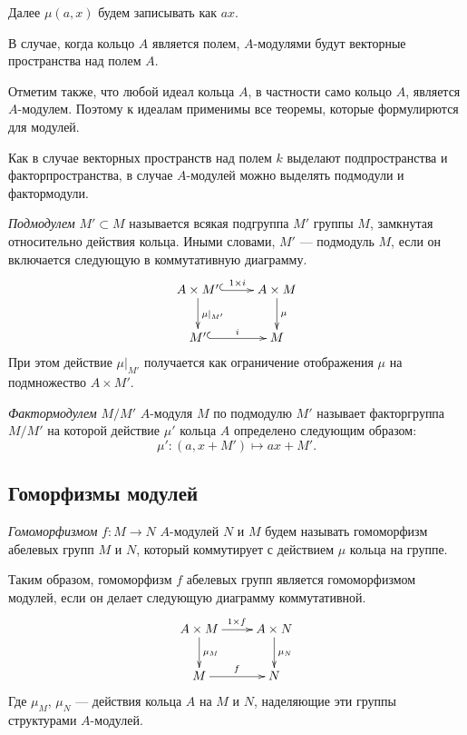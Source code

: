     Далее $\mu(a, x)$ будем записывать как $ax$. 
    
    В случае, когда кольцо $A$ является полем, $A$-модулями будут векторные пространства над полем $A$.
    
    Отметим также, что любой идеал кольца $A$, в частности само кольцо $A$, является $A$-модулем. 
    Поэтому к идеалам применимы все теоремы, которые формулирются для модулей.

    Как в случае векторных пространств над полем $k$ выделают подпространства и факторпространства, в случае $A$-модулей можно выделять подмодули и фактормодули.

    \begin{Def}
        \textit{Подмодулем} $M' \subset M$ называется всякая подгруппа $M'$ группы $M$, замкнутая относительно действия кольца. Иными словами, $M'$ --- подмодуль $M$, 
        если он включается следующую в коммутативную диаграмму.
        $$
        \xymatrix {
            A \times M' \ar@{^{(}->}[r]^{1 \times i} \ar[d]^{\mu |_{M'}} & A \times M \ar[d]^{\mu} \\
            M' \ar@{^{(}->}[r]^{i} & M
        }
        $$
        При этом действие $\mu|_{M'}$ получается как ограничение отображения $\mu$ на подмножество $A \times M'$.
    \end{Def}
    
    \begin{Def}
        \textit{Фактормодулем} $M/M'$ $A$-модуля $M$ по подмодулю $M'$ называет факторгруппа $M/M'$ на которой действие $\mu'$ кольца $A$ определено следующим образом:
        $$
            \mu' : (a, x + M') \mapsto ax + M'.
        $$
    \end{Def}

    \subsection{Гоморфизмы модулей}

    \begin{Def}
        \textit{Гомоморфизмом} $f : M \rightarrow N$ $A$-модулей $N$ и $M$ будем называть гомоморфизм абелевых групп $M$ и $N$, который коммутирует с действием $\mu$ кольца на группе.
    \end{Def} 
    Таким образом, гомоморфизм $f$ абелевых групп является гомоморфизмом модулей, если он делает следующую диаграмму коммутативной.
    $$
    \xymatrix{
        A \times M \ar[d]^{\mu_M} \ar[r]^{1 \times f} & A \times N  \ar[d]^{\mu_N} \\
        M \ar[r]^f & N
    }
    $$
    Где $\mu_M$, $\mu_N$ --- действия кольца $A$ на $M$ и $N$, наделяющие эти группы структурами $A$-модулей.


